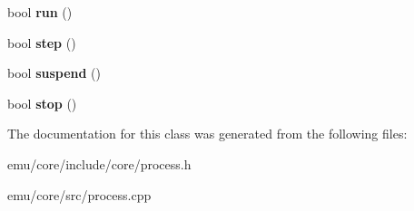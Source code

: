 \begin{DoxyCompactItemize}
\item 
\mbox{\label{classeka2l1_1_1process_a540316b08bab49d8a89c9a1218ee891d}} 
bool {\bfseries run} ()
\item 
\mbox{\label{classeka2l1_1_1process_a8cb35055648c54f25c3ebf39c2c7955d}} 
bool {\bfseries step} ()
\item 
\mbox{\label{classeka2l1_1_1process_a1795486664499467dee470a79ad5bfab}} 
bool {\bfseries suspend} ()
\item 
\mbox{\label{classeka2l1_1_1process_a88d6a07cf5372fdc4d624ce64051a4f6}} 
bool {\bfseries stop} ()
\end{DoxyCompactItemize}


The documentation for this class was generated from the following files\+:\begin{DoxyCompactItemize}
\item 
emu/core/include/core/process.\+h\item 
emu/core/src/process.\+cpp\end{DoxyCompactItemize}
